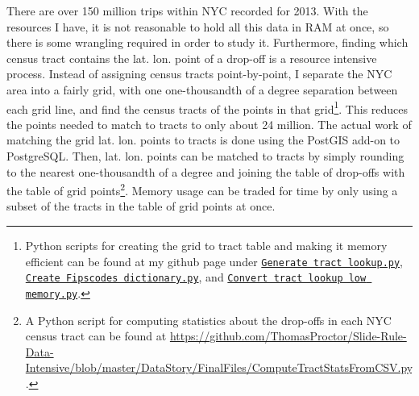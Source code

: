 \documentclass[11pt]{article}
\begin{document}
There are over 150 million trips within NYC recorded for 2013. With the resources I have, it is not reasonable to hold all this data in RAM at once, so there is some wrangling required in order to study it.
Furthermore, finding which census tract contains the lat. lon.  point of a drop-off is a resource intensive process.
Instead of assigning census tracts point-by-point, I separate the NYC area into a fairly grid, with one one-thousandth of a degree separation between each grid line, and find the census tracts of the points in that grid\footnote{Python scripts for creating the grid to tract table and making it memory efficient can be found at my github page under \href{https://github.com/ThomasProctor/Slide-Rule-Data-Intensive/blob/master/DataStory/FinalFiles/Generate\%20gps\%20tract\%20lookup.py}{\texttt{Generate tract lookup.py}},
\href{https://github.com/ThomasProctor/Slide-Rule-Data-Intensive/blob/master/DataStory/FinalFiles/Create\%20Fipscodes\%20dictionary.py}{\texttt{Create Fipscodes dictionary.py}}, 
and \href{https://github.com/ThomasProctor/Slide-Rule-Data-Intensive/blob/master/DataStory/FinalFiles/Convert\%20gps\%20tract\%20lookup\%20low\%20memory.py}{\texttt{Convert tract lookup low memory.py}}.}.
This reduces the points needed to match to tracts to only about 24 million.
The actual work of matching the grid lat. lon.  points to tracts is done using the PostGIS add-on to PostgreSQL.
Then, lat. lon.  points can be matched to tracts by simply rounding to the nearest one-thousandth of a degree and joining the table of drop-offs with the table of grid points\footnote{A Python script for computing statistics about the drop-offs in each NYC census tract can be found at \url{https://github.com/ThomasProctor/Slide-Rule-Data-Intensive/blob/master/DataStory/FinalFiles/ComputeTractStatsFromCSV.py}.}.
Memory usage can be traded for time by only using a subset of the tracts in the table of grid points at once.
 

\end{document}
